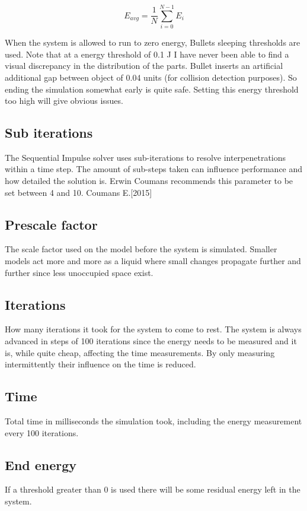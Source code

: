 \begin{equation}
E_{avg} = \frac{1}{N}\sum_{i=0}^{N-1}E_i
\end{equation}

When the system is allowed to run to zero energy, Bullets sleeping thresholds are
used. Note that at a energy threshold of 0.1 J I have never been able
to find a visual discrepancy in the distribution of the parts. Bullet inserts an
artificial additional gap between object of 0.04 units (for collision detection purposes).
So ending the simulation somewhat early is quite safe. Setting this energy threshold
too high will give obvious issues.

\subsection{Sub iterations}
The Sequential Impulse solver uses sub-iterations to resolve interpenetrations within
a time step. The amount of sub-steps taken can influence performance and how detailed
the solution is. Erwin Coumans recommends this parameter to be set between 4 and 10. Coumans E.[2015]

\subsection{Prescale factor}
The scale factor used on the model before the system is simulated.
Smaller models act more and more as a liquid where small changes propagate further
and further since less unoccupied space exist.

\subsection{Iterations}
How many iterations it took for the system to come to rest. The system is always
advanced in steps of 100 iterations since the energy needs to be measured and it
is, while quite cheap, affecting the time measurements. By only measuring intermittently
their influence on the time is reduced.

\subsection{Time}
Total time in milliseconds the simulation took, including the energy measurement
every 100 iterations.

\subsection{End energy}\label{subsec:enden}
If a threshold greater than 0 is used there will be some residual energy left in the
system.

